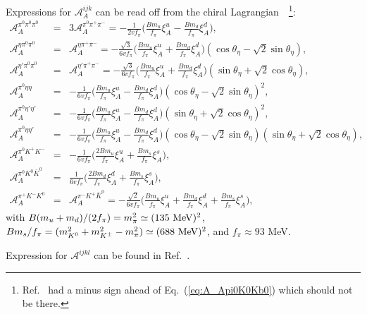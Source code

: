 \documentclass[letterpaper,11pt]{article}
\begin{document}
{Expressions for $\mathcal{A}_A^{ijk}$   can be read off from the chiral Lagrangian~\cite{Domingo:2016yih}~\footnote{ Ref.~\cite{Domingo:2016yih} had a minus sign ahead of Eq.~(\ref{eq:A_Api0K0Kb0}) which should not be there.  }: 
\begin{eqnarray}
\mathcal{A}_A^{\pi^0\pi^0\pi^0}&=&3\mathcal{A}_A^{\pi^0\pi^+\pi^-}=-\frac{1}{2vf_\pi}\biggl(\frac{Bm_u}{f_\pi}\xi_A^u-\frac{Bm_d}{f_\pi}\xi_A^d\biggr),\\
\mathcal{A}_A^{\eta\pi^0\pi^0}&=&\mathcal{A}_A^{\eta\pi^+\pi^-}=-\frac{\sqrt{3} }{6vf_\pi}\biggl(\frac{Bm_u}{f_\pi}\xi_A^u+\frac{Bm_d}{f_\pi}\xi_A^d\biggr)(\cos\theta_\eta-\sqrt{2}\sin\theta_\eta),\\
\mathcal{A}_A^{\eta'\pi^0\pi^0}&=&\mathcal{A}_A^{\eta'\pi^+\pi^-}=-\frac{\sqrt{3} }{6vf_\pi}\biggl(\frac{Bm_u}{f_\pi}\xi_A^u+\frac{Bm_d}{f_\pi}\xi_A^d\biggr)(\sin\theta_\eta+\sqrt{2}\cos\theta_\eta),\\
\mathcal{A}_A^{\pi^0\eta\eta}&=&-\frac{1}{6vf_\pi}\biggl(\frac{Bm_u}{f_\pi}\xi_A^u-\frac{Bm_d}{f_\pi}\xi_A^d\biggr)(\cos\theta_\eta-\sqrt{2}\sin\theta_\eta)^2,\\
\mathcal{A}_A^{\pi^0\eta'\eta'}&=&-\frac{1}{6vf_\pi}\biggl(\frac{Bm_u}{f_\pi}\xi_A^u-\frac{Bm_d}{f_\pi}\xi_A^d\biggr)(\sin\theta_\eta+\sqrt{2}\cos\theta_\eta)^2,\\
\mathcal{A}_A^{\pi^0\eta\eta'}&=&-\frac{1}{6vf_\pi}\biggl(\frac{Bm_u}{f_\pi}\xi_A^u-\frac{Bm_d}{f_\pi}\xi_A^d\biggr)(\cos\theta_\eta-\sqrt{2}\sin\theta_\eta)(\sin\theta_\eta+\sqrt{2}\cos\theta_\eta),\\
\mathcal{A}_A^{\pi^0 K^+K^-}&=&-\frac{1}{6vf_\pi}\biggl(\frac{2Bm_u}{f_\pi}\xi_A^u+\frac{Bm_s}{f_\pi}\xi_A^s\biggr),\\
\mathcal{A}_A^{\pi^0 K^0\bar K^0}&=&\frac{1}{6vf_\pi}\biggl(\frac{2Bm_d}{f_\pi}\xi_A^d+\frac{Bm_s}{f_\pi}\xi_A^s\biggr), \label{eq:A_Api0K0Kb0}\\
\mathcal{A}_A^{\pi^+ K^- K^0}&=&\mathcal{A}_A^{\pi^- K^+ \bar K^0}=-\frac{\sqrt{2}}{6vf_\pi}\biggl(\frac{Bm_u}{f_\pi}\xi_A^u+\frac{Bm_d}{f_\pi}\xi_A^d+\frac{Bm_s}{f_\pi}\xi_A^s\biggr),
\end{eqnarray}
with $B(m_u+m_d)/(2f_\pi)=m_\pi^2\simeq (135{\ \rm MeV})^2$, $Bm_s/f_\pi= (m_{K^0}^2+m_{K^\pm}^2-m_\pi^2)\simeq (688{\ \rm MeV})^2$,  and $f_\pi \approx 93 $ MeV. 


Expression for $\mathcal{A}^{ijkl}$ can be found in Ref.~\cite{Domingo:2016yih}.
 
 

}
\end{document}
